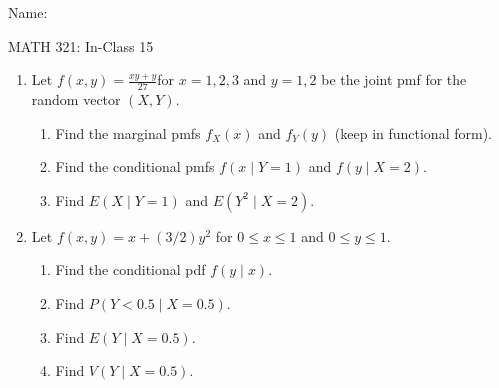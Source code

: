 \documentclass{article}
\begin{document}
\hspace{375pt}Name:

\begin{center}
{\Huge MATH 321: In-Class 15}
\end{center}

\bigskip\bigskip


\begin{enumerate}
    \item Let $\displaystyle f(x,y) = \frac{xy + y}{27}$\quad for $x = 1, 2, 3$ and $y = 1, 2$ be the joint pmf for the random vector $(X,Y)$.%
    \begin{enumerate}
        \item Find the marginal pmfs $f_X(x)$ and $f_Y(y)$ (keep in functional form).\vspace{100pt}
        \item Find the conditional pmfs $f(x \mid Y = 1)$ and $f(y \mid X = 2)$.\vspace{100pt}%
        \item Find $E(X \mid Y = 1)$ and $E(Y^2 \mid X = 2)$.\vspace{100pt}%
    \end{enumerate}
    
    \item Let $f(x,y) = x + (3/2) y^2$ \quad for $0 \le x \le 1$ and $0 \le y \le 1$.%
    \begin{enumerate}
        \item Find the conditional pdf $f(y \mid x)$.\vspace{200pt}
        \item Find $P(Y < 0.5 \mid X = 0.5)$.\vspace{150pt}
        \item Find $E(Y \mid X = 0.5)$.\vspace{150pt} 
        \item Find $V(Y \mid X = 0.5)$.\vspace{150pt}
    \end{enumerate}
    
\end{enumerate}
\end{document}
